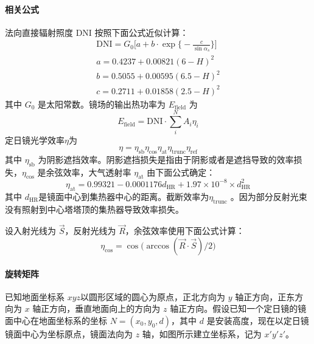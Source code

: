 \documentclass[../main.tex]{subfiles}
\begin{document}
\paragraph{相关公式}
法向直接辐射照度 DNI 按照下面公式近似计算：
\[
\begin{aligned}
\mathrm{DNI} = G_{0} \bigg[ a + b \cdot \exp\Big\{{-}\frac{c}{\sin \alpha_{s}}\Big\}\bigg]\\
a = 0.4237 + 0.00821 (6 - H) ^{2} \\
b = 0.5055 + 0.00595(6.5 - H) ^{2} \\
c = 0.2711 + 0.01858 (2.5 - H) ^{2}
\end{aligned}
\]
其中 \(G_{0}\) 是太阳常数。镜场的输出热功率为 \(E_{\mathrm{field}}\) 为
\begin{equation}
E_{\mathrm{field}} = \mathrm{DNI} \cdot \sum _{i} ^{N} A_{i} \eta _{i}
\end{equation}
定日镜光学效率\(\eta\)为
\begin{equation}
\eta = \eta _{\mathrm{s b}} \eta _{\cos} \eta _{\mathrm{at}} \eta _{\mathrm{trunc}} \eta _{\mathrm{ref}}
\end{equation}
其中 \(\eta _{\mathrm{s b}}\) 为阴影遮挡效率。阴影遮挡损失是指由于阴影或者是遮挡导致的效率损失，\(\eta _{\cos}\) 是余弦效率，大气透射率 \(\eta _{\mathrm{at}}\) 由下面公式确定：
\begin{equation}
\eta _{\mathrm{at}} = 0.99321 - 0.0001176 d _{\mathrm{HR}} + 1.97 \times 10 ^{-8} \times d _{\mathrm{HR}} ^{2}
\end{equation}
其中 \(d _{\mathrm{HR}}\)是镜面中心到集热器中心的距离。截断效率为\(\eta _{\mathrm{trunc}}\) 。因为部分反射光束没有照射到中心塔塔顶的集热器导致效率损失。

设入射光线为 \(\vec S\)，反射光线为 \(\vec R\)，余弦效率使用下面公式计算：
\begin{equation}
\eta _{\cos} = \cos \big(\arccos (\vec R \cdot \vec S) / 2\big)
\end{equation}
\paragraph{旋转矩阵}
已知地面坐标系 \(x y z\)以圆形区域的圆心为原点，正北方向为 \(y\) 轴正方向，正东方向为 \(x\) 轴正方向，垂直地面向上的方向为 \(z\) 轴正方向。假设已知一个定日镜的镜面中心在地面坐标系的坐标 \(N = (x_0,  y_0 , d)\)，其中 \(d\) 是安装高度，现在以定日镜镜面中心为坐标原点，镜面法向为 \(z\) 轴，如图所示建立坐标系，记为 \(x'y'z'\)。
\end{document}
